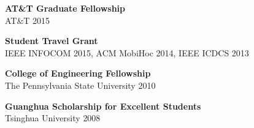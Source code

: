 \documentclass[margin,line]{res}
\begin{document}
\begin{resume}
{\bf AT\&T Graduate Fellowship}\\
AT\&T \hfill {2015}
\vspace{-0.1in}

{\bf Student Travel Grant}\\
IEEE INFOCOM 2015, ACM MobiHoc 2014, IEEE ICDCS 2013
\vspace{-0.1in}

{\bf College of Engineering Fellowship}\\
The Pennsylvania State University \hfill { 2010}
\vspace{-0.1in}

{\bf Guanghua Scholarship for Excellent Students} \\
Tsinghua University \hfill  { 2008}
\vspace{-0.1in}



\end{resume}
\end{document}
